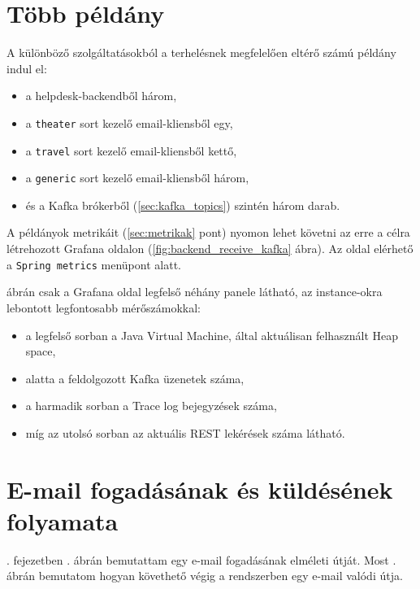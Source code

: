 \section{Több példány}
A különböző szolgáltatásokból a terhelésnek megfelelően eltérő számú példány indul el:

\begin{itemize}
	\item a helpdesk-backendből három,
	\item a \texttt{theater} sort kezelő email-kliensből egy,
	\item a \texttt{travel} sort kezelő email-kliensből kettő,
	\item a \texttt{generic} sort kezelő email-kliensből három,
	\item és a Kafka brókerből (\ref{sec:kafka_topics}) szintén három darab.
\end{itemize}

A példányok metrikáit (\ref{sec:metrikak} pont) nyomon lehet követni az erre a célra létrehozott Grafana oldalon (\ref{fig:backend_receive_kafka} ábra). Az oldal elérhető a  \texttt{Spring metrics} menüpont alatt.

 ábrán csak a Grafana oldal legfelső néhány panele látható, az instance-okra lebontott legfontosabb mérőszámokkal:

\begin{itemize}
	\item a legfelső sorban a Java Virtual Machine, által aktuálisan felhasznált Heap space,	
	\item alatta a feldolgozott Kafka üzenetek száma,
	\item a harmadik sorban a Trace log bejegyzések száma,
	\item míg az utolsó sorban az aktuális REST lekérések száma látható.
\end{itemize}



\section{E-mail fogadásának és küldésének folyamata}
. fejezetben . ábrán bemutattam egy e-mail fogadásának elméleti útját. Most . ábrán bemutatom hogyan követhető végig a rendszerben egy e-mail valódi útja.

